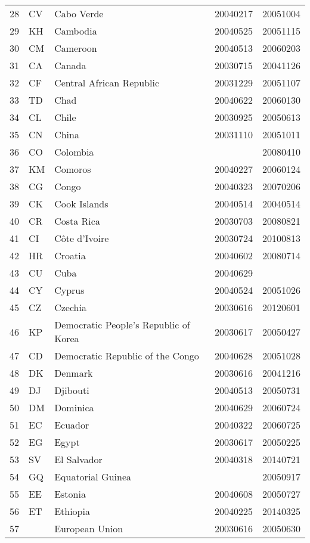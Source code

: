 \begin{longtable}{rllrr}
  28 & CV & Cabo Verde & 20040217 & 20051004 \\ 
  29 & KH & Cambodia & 20040525 & 20051115 \\ 
  30 & CM & Cameroon & 20040513 & 20060203 \\ 
  31 & CA & Canada & 20030715 & 20041126 \\ 
  32 & CF & Central African Republic & 20031229 & 20051107 \\ 
  33 & TD & Chad & 20040622 & 20060130 \\ 
  34 & CL & Chile & 20030925 & 20050613 \\ 
  35 & CN & China & 20031110 & 20051011 \\ 
  36 & CO & Colombia &  & 20080410 \\ 
  37 & KM & Comoros & 20040227 & 20060124 \\ 
  38 & CG & Congo & 20040323 & 20070206 \\ 
  39 & CK & Cook Islands & 20040514 & 20040514 \\ 
  40 & CR & Costa Rica & 20030703 & 20080821 \\ 
  41 & CI & Côte d'Ivoire & 20030724 & 20100813 \\ 
  42 & HR & Croatia & 20040602 & 20080714 \\ 
  43 & CU & Cuba & 20040629 &  \\ 
  44 & CY & Cyprus & 20040524 & 20051026 \\ 
  45 & CZ & Czechia & 20030616 & 20120601 \\ 
  46 & KP & Democratic People's Republic of Korea & 20030617 & 20050427 \\ 
  47 & CD & Democratic Republic of the Congo & 20040628 & 20051028 \\ 
  48 & DK & Denmark & 20030616 & 20041216 \\ 
  49 & DJ & Djibouti & 20040513 & 20050731 \\ 
  50 & DM & Dominica & 20040629 & 20060724 \\ 
  51 & EC & Ecuador & 20040322 & 20060725 \\ 
  52 & EG & Egypt & 20030617 & 20050225 \\ 
  53 & SV & El Salvador & 20040318 & 20140721 \\ 
  54 & GQ & Equatorial Guinea &  & 20050917 \\ 
  55 & EE & Estonia & 20040608 & 20050727 \\ 
  56 & ET & Ethiopia & 20040225 & 20140325 \\ 
  57 &  & European Union & 20030616 & 20050630 \\ 

\end{longtable}

